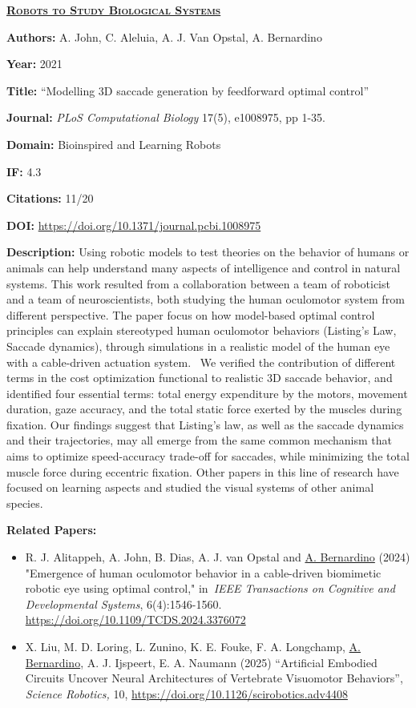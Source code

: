 \clearpage

\textbf{\textsc{\ul{Robots to Study Biological Systems}}}

\textbf{Authors:} A. John, C. Aleluia, A. J. Van Opstal, A. Bernardino

\textbf{Year:} 2021

\textbf{Title:} ``Modelling 3D saccade generation by feedforward optimal
control''

\textbf{Journal:} \emph{PLoS Computational Biology} 17(5), e1008975, pp
1-35.

\textbf{Domain:} Bioinspired and Learning Robots

\textbf{IF:} 4.3

\textbf{Citations:} 11/20

\textbf{DOI:} \url{https://doi.org/10.1371/journal.pcbi.1008975}

\textbf{Description:} Using robotic models to test theories on the
behavior of humans or animals can help understand many aspects of
intelligence and control in natural systems. This work resulted from a
collaboration between a team of roboticist and a team of
neuroscientists, both studying the human oculomotor system from
different perspective. The paper focus on how model-based optimal
control principles can explain stereotyped human oculomotor behaviors
(Listing's Law, Saccade dynamics), through simulations in a realistic
model of the human eye with a cable-driven actuation system. ~We
verified the contribution of different terms in the cost optimization
functional to realistic 3D saccade behavior, and identified four
essential terms: total energy expenditure by the motors, movement
duration, gaze accuracy, and the total static force exerted by the
muscles during fixation. Our findings suggest that Listing's law, as
well as the saccade dynamics and their trajectories, may all emerge from
the same common mechanism that aims to optimize speed-accuracy trade-off
for saccades, while minimizing the total muscle force during eccentric
fixation. Other papers in this line of research have focused on learning
aspects and studied the visual systems of other animal species.

\textbf{Related Papers:}

\begin{itemize}
\item
  R. J. Alitappeh, A. John, B. Dias, A. J. van Opstal and \ul{A.
  Bernardino} (2024) "Emergence of human oculomotor behavior in a
  cable-driven biomimetic robotic eye using optimal control,"
  in~\emph{IEEE Transactions on Cognitive and Developmental Systems},
  6(4):1546-1560. \url{https://doi.org/10.1109/TCDS.2024.3376072}
\item
  X. Liu, M. D. Loring, L. Zunino, K. E. Fouke, F. A. Longchamp, \ul{A.
  Bernardino}, A. J. Ijspeert, E. A. Naumann (2025) ``Artificial
  Embodied Circuits Uncover Neural Architectures of Vertebrate
  Visuomotor Behaviors'', \emph{Science Robotics,} 10,
  \url{https://doi.org/10.1126/scirobotics.adv4408}
\end{itemize}

